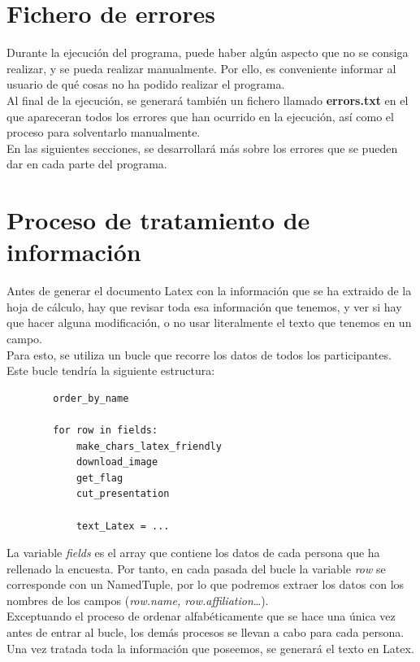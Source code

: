 \documentclass[a4paper, 12pt]{book}
\begin{document}
\section{Fichero de errores}
\label{sec:errores}
Durante la ejecución del programa, puede haber algún aspecto que no se consiga realizar, y se pueda realizar manualmente. Por ello, es conveniente informar al usuario de qué cosas no ha podido realizar el programa.\\

Al final de la ejecución, se generará también un fichero llamado \textbf{errors.txt} en el que apareceran todos los errores que han ocurrido en la ejecución, así como el proceso para solventarlo manualmente.\\

En las siguientes secciones, se desarrollará más sobre los errores que se pueden dar en cada parte del programa.

\section{Proceso de tratamiento de información}
\label{sec:tratainfo}
Antes de generar el documento Latex con la información que se ha extraido de la hoja de cálculo, hay que revisar toda esa información que tenemos, y ver si hay que hacer alguna modificación, o no usar literalmente el texto que tenemos en un campo.\\

Para esto, se utiliza un bucle que recorre los datos de todos los participantes. Este bucle tendría la siguiente estructura:

\begin{verbatim}
        order_by_name

        for row in fields:
            make_chars_latex_friendly
            download_image
            get_flag
            cut_presentation
    
            text_Latex = ...   
\end{verbatim}

La variable \textit{fields} es el array que contiene los datos de cada persona que ha rellenado la encuesta. Por tanto, en cada pasada del bucle la variable \textit{row} se corresponde con un NamedTuple, por lo que podremos extraer los datos con los nombres de los campos (\textit{row.name, row.affiliation}\ldots).\\

Exceptuando el proceso de ordenar alfabéticamente que se hace una única vez antes de entrar al bucle, los demás procesos se llevan a cabo para cada persona. Una vez tratada toda la información que poseemos, se generará el texto en Latex.
\end{document}
